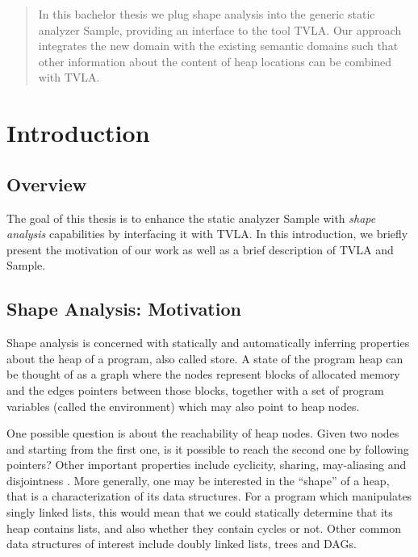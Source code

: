 \documentclass[11pt,a4paper,english]{article}
\begin{document}
\makecustomtitlepage

\begin{abstract}
In this bachelor thesis we plug shape analysis into the generic static analyzer
Sample, providing an interface to the tool TVLA. Our approach integrates the new
domain with the existing semantic domains such that other information about the
content of heap locations can be combined with TVLA. 

\end{abstract}
\thispagestyle{empty}
\newpage


\tableofcontents
\newpage

\section{Introduction}
\subsection{Overview}
The goal of this thesis is to enhance the static analyzer Sample with
\textit{shape analysis} capabilities by interfacing it with TVLA. In this
introduction, we briefly present the motivation of our work as well as a brief 
description of TVLA and Sample.

\subsection{Shape Analysis: Motivation}
Shape analysis is concerned with statically and automatically inferring
properties about the heap of a program, also called store. A state of
the program heap can be thought of as a graph where the nodes represent blocks
of allocated memory and the edges pointers between those blocks, together with a
set of program variables (called the environment) which may also point to heap
nodes.

One possible question is about the reachability of heap
nodes. Given two nodes and starting from the first one, is it possible to reach
the second one by following pointers? Other important properties include cyclicity,
sharing, may-aliasing and disjointness \cite{wilhelm2000shape}.  More generally,
one may be interested in the ``shape'' of a heap, that is a characterization of
its data structures. For a program which manipulates singly linked lists, this
would mean that we could statically determine that its heap contains lists, and
also whether they contain cycles or not. Other common data structures of
interest include doubly linked lists, trees and DAGs.
\end{document}
